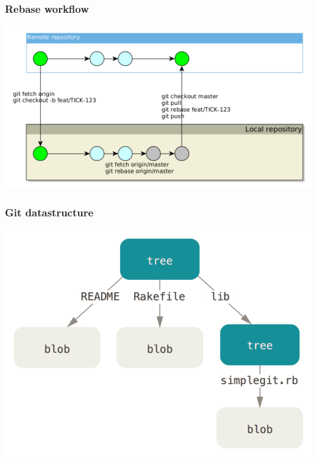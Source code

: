 \documentclass{beamer}
\begin{document}
    \begin{frame}
        \frametitle{Rebase workflow}
        \includegraphics[width=\textwidth]{images/git-commits/20-rebase-workflow}
    \end{frame}


    \begin{frame}
        \frametitle{Git datastructure}
        \includegraphics[width=\textwidth]{images/git-data-model-1}
    \end{frame}
\end{document}

